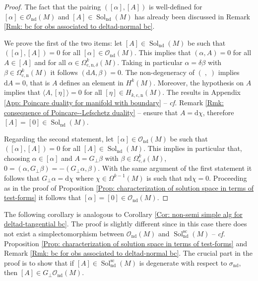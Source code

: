 \begin{proof}
	The fact that the pairing $([\alpha],[A])$ is well-defined for $[\alpha]\in\mathcal{O}_{\mathrm{nd}}(M)$ and $[A]\in\operatorname{Sol}_{\mathrm{nd}}(M)$ has already been discussed in Remark \ref{Rmk: bc for obs associated to deltad-normal bc}.
	
	We prove the first of the two items: let $[A]\in\operatorname{Sol}_{\mathrm{nd}}(M)$ be such that $([\alpha],[A])=0$ for all $[\alpha]\in\mathcal{O}_{\mathrm{nd}}(M)$.
	This implies that $(\alpha,A)=0$ for all $A\in[A]$ and for all $\alpha\in\Omega_{\mathrm{c,n},\delta}^k(M)$. Taking in particular $\alpha=\delta\beta$ with $\beta\in\Omega_{\mathrm{c,n}}^k(M)$ it follows $(\mathrm{d}A,\beta)=0$.
	The non-degeneracy of $(\;,\;)$ implies $\mathrm{d}A=0$, that is $A$ defines an element in $H^k(M)$.
	Moreover, the hypothesis on $A$ implies that $\langle A,[\eta]\rangle=0$ for all $[\eta]\in H_{k,\mathrm{c,n}}(M)$. The results in Appendix \ref{App: Poincare duality for manifold with boundary} -- \textit{cf.} Remark \ref{Rmk: consequence of Poincare--Lefschetz duality} -- ensure that $A=\mathrm{d}\chi$, therefore $[A]=[0]\in\operatorname{Sol}_{\mathrm{nd}}(M)$.
	
	Regarding the second statement, let $[\alpha]\in\mathcal{O}_{\mathrm{nd}}(M)$ be such that $([\alpha],[A])=0$ for all $[A]\in\operatorname{Sol}_{\mathrm{nd}}(M)$.
	This implies in particular that, choosing $\alpha\in[\alpha]$ and $A=G_\perp\beta$ with $\beta\in\Omega_{\mathrm{c},\delta}^k(M)$,  $0=(\alpha,G_\perp\beta)=-(G_\perp\alpha,\beta)$.
	With the same argument of the first statement it follows that $G_\perp\alpha=\mathrm{d}\chi$ where $\chi\in\Omega^{k-1}(M)$ is such that $\mathrm{nd}\chi=0$.
	Proceeding as in the proof of Proposition \ref{Prop: characterization of solution space in terms of test-forms} it follows that $[\alpha]=[0]\in\mathcal{O}_{\mathrm{nd}}(M)$.	
\end{proof}

The following corollary is analogous to Corollary \ref{Cor: non-semi simple alg for deltad-tangential bc}.
The proof is slightly different since in this case there does not exist a simplectomorphism between $\mathcal{O}_{\mathrm{nd}}(M)$ and $\operatorname{Sol}_{\mathrm{nd}}^{\mathrm{sc}}(M)$ -- \textit{cf.} Proposition \ref{Prop: characterization of solution space in terms of test-forms} and Remark \ref{Rmk: bc for obs associated to deltad-normal bc}.
The crucial part in the proof is to show that if $[A]\in\operatorname{Sol}_{\mathrm{nd}}^{\mathrm{sc}}(M)$ is degenerate with respect to $\sigma_{\mathrm{nd}}$, then $[A]\in G_\perp\mathcal{O}_{\mathrm{nd}}(M)$.

